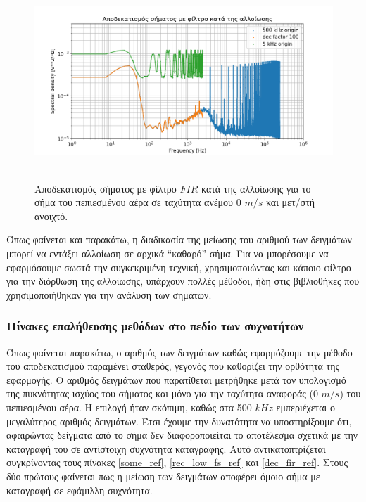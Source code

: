 \documentclass[breaklines=true, 12pt]{article}
\begin{document}
{{{\begin{figure}[htbp]
\centering
\includegraphics[width=500px,height=280px]{./decimation/anti_aliasing_fir.png}
\caption{\label{without_al}Αποδεκατισμός σήματος με φίλτρο \(FIR\) κατά της αλλοίωσης για το σήμα του πεπιεσμένου αέρα σε ταχύτητα ανέμου 0 \(m/s\) και μετ/στή ανοιχτό.}
\end{figure}

Όπως φαίνεται και παρακάτω, η διαδικασία της μείωσης του αριθμού των
δειγμάτων μπορεί να εντάξει αλλοίωση σε αρχικά “καθαρό” σήμα. Για να
μπορέσουμε να εφαρμόσουμε σωστά την συγκεκριμένη τεχνική, χρησιμοποιώντας
και κάποιο φίλτρο για την διόρθωση της αλλοίωσης, υπάρχουν πολλές μέθοδοι,
ήδη στις βιβλιοθήκες που χρησιμοποιήθηκαν για την ανάλυση των σημάτων.
\subsubsection{\textbf{Πίνακες επαλήθευσης μεθόδων στο πεδίο των συχνοτήτων}}
\label{sec:org7dc9621}

Όπως φαίνεται παρακάτω, ο αριθμός των δειγμάτων καθώς
εφαρμόζουμε την μέθοδο του αποδεκατισμού παραμένει σταθερός, γεγονός που
καθορίζει την ορθότητα της εφαρμογής. Ο αριθμός δειγμάτων που παρατίθεται
μετρήθηκε μετά τον υπολογισμό της πυκνότητας ισχύος του σήματος και μόνο
για την ταχύτητα αναφοράς (0 \(m/s\)) του πεπιεσμένου αέρα. Η επιλογή
ήταν σκόπιμη, καθώς στα 500 \(kHz\) εμπεριέχεται ο μεγαλύτερος αριθμός
δειγμάτων. Έτσι έχουμε την δυνατότητα να υποστηρίξουμε ότι, αφαιρώντας
δείγματα από το σήμα δεν διαφοροποιείται το αποτέλεσμα σχετικά με την
καταγραφή του σε αντίστοιχη συχνότητα καταγραφής. Αυτό αντικατοπτρίζεται
συγκρίνοντας τους πίνακες \ref{some_ref}, \ref{rec_low_fs_ref} και \ref{dec_fir_ref}. Στους
δύο πρώτους φαίνεται πως η μείωση των δειγμάτων αποφέρει όμοιο σήμα με
καταγραφή σε εφάμιλλη συχνότητα.

}}}
\end{document}
